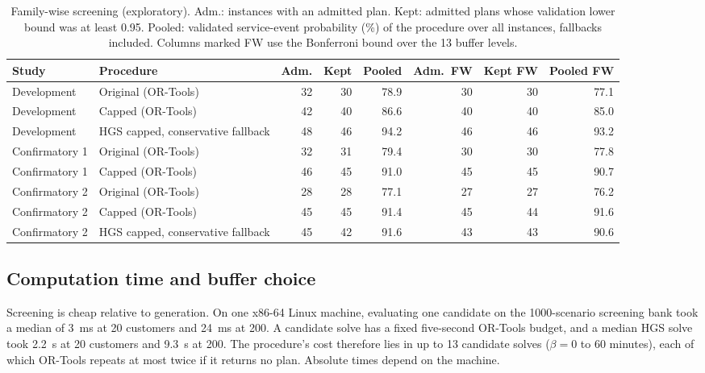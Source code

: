 \begin{table}[htbp]
\centering
\footnotesize
\setlength{\tabcolsep}{4pt}
\caption{Family-wise screening (exploratory). Adm.: instances with an admitted plan. Kept: admitted plans whose validation lower bound was at least 0.95. Pooled: validated service-event probability (\%) of the procedure over all instances, fallbacks included. Columns marked FW use the Bonferroni bound over the 13 buffer levels.}
\label{tab:familywise}
\begin{tabular}{@{}l>{\raggedright\arraybackslash}p{3.1cm}rrrrrr@{}}
\toprule
Study & Procedure & Adm. & Kept & Pooled & Adm.\ FW & Kept FW & Pooled FW\\
\midrule
Development & Original (OR-Tools) & 32 & 30 & 78.9 & 30 & 30 & 77.1\\
Development & Capped (OR-Tools) & 42 & 40 & 86.6 & 40 & 40 & 85.0\\
Development & HGS capped, conservative fallback & 48 & 46 & 94.2 & 46 & 46 & 93.2\\
Confirmatory 1 & Original (OR-Tools) & 32 & 31 & 79.4 & 30 & 30 & 77.8\\
Confirmatory 1 & Capped (OR-Tools) & 46 & 45 & 91.0 & 45 & 45 & 90.7\\
Confirmatory 2 & Original (OR-Tools) & 28 & 28 & 77.1 & 27 & 27 & 76.2\\
Confirmatory 2 & Capped (OR-Tools) & 45 & 45 & 91.4 & 45 & 44 & 91.6\\
Confirmatory 2 & HGS capped, conservative fallback & 45 & 42 & 91.6 & 43 & 43 & 90.6\\
\bottomrule
\end{tabular}
\end{table}

\subsection{Computation time and buffer choice}\label{sec:time}

Screening is cheap relative to generation. On one x86-64 Linux machine, evaluating one candidate on the 1000-scenario screening bank took a median of 3~ms at 20 customers and 24~ms at 200. A candidate solve has a fixed five-second OR-Tools budget, and a median HGS solve took 2.2~s at 20 customers and 9.3~s at 200. The procedure's cost therefore lies in up to 13 candidate solves ($\beta=0$ to 60 minutes), each of which OR-Tools repeats at most twice if it returns no plan. Absolute times depend on the machine.

